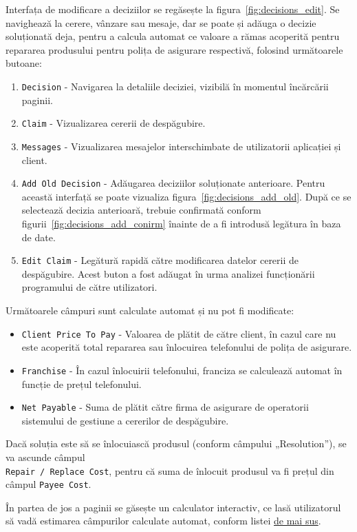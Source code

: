 			Interfața de modificare a deciziilor se regăsește la figura~\ref{fig:decisions_edit}.
			Se navighează la cerere, vânzare sau mesaje, dar se poate și adăuga o decizie soluționată deja, pentru a calcula automat ce valoare a rămas acoperită pentru repararea produsului pentru polița de asigurare respectivă, folosind următoarele butoane:
			\begin{enumerate}
				\item \verb|Decision| - Navigarea la detaliile deciziei, vizibilă în momentul încărcării paginii.
				\item \verb|Claim| - Vizualizarea cererii de despăgubire.
				\item \verb|Messages| - Vizualizarea mesajelor interschimbate de utilizatorii aplicației și client.
				\item \verb|Add Old Decision| - Adăugarea deciziilor soluționate anterioare.
				Pentru această interfață se poate vizualiza figura~\ref{fig:decisions_add_old}.
				După ce se selectează decizia anterioară, trebuie confirmată conform figurii~\ref{fig:decisions_add_conirm} înainte de a fi introdusă legătura în baza de date.
				\item \verb|Edit Claim| - Legătură rapidă către modificarea datelor cererii de despăgubire.
				Acest buton a fost adăugat în urma analizei funcționării programului de către utilizatori.
			\end{enumerate}

			Următoarele câmpuri sunt calculate automat și nu pot fi modificate:
			\begin{itemize}
				\item \verb|Client Price To Pay| - Valoarea de plătit de către client, în cazul care nu este acoperită total repararea sau înlocuirea telefonului de polița de asigurare.
				\item \verb|Franchise| - În cazul înlocuirii telefonului, franciza se calculează automat în funcție de prețul telefonului.
				\item \verb|Net Payable| - Suma de plătit către firma de asigurare de operatorii sistemului de gestiune a cererilor de despăgubire.
			\end{itemize}
			\label{lst:itemize}

			Dacă soluția este să se înlocuiască produsul (conform câmpului „Resolution”), se va ascunde câmpul \\
			\verb|Repair / Replace Cost|, pentru că suma de înlocuit produsul va fi prețul din câmpul \verb|Payee Cost|.

			În partea de jos a paginii se găsește un calculator interactiv, ce lasă utilizatorul să vadă estimarea câmpurilor calculate automat, conform listei \hyperref[lst:itemize]{de mai sus}.


